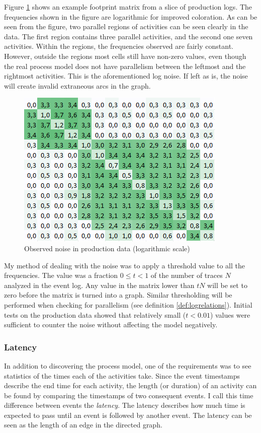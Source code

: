 \documentclass[english,12pt,a4paper,pdftex,sci,utf8]{aaltothesis}
\theoremstyle{definition}
\begin{document}
Figure \ref{fig:examplenoise} shows an example footprint matrix from a slice of production logs.
The frequencies shown in the figure are logarithmic for improved coloration.
As can be seen from the figure, two parallel regions of activities can be seen clearly in the data.
The first region contains three parallel activities, and the second one seven activities.
Within the regions, the frequencies observed are fairly constant.
However, outside the regions most cells still have non-zero values, even though the real process model
does not have parallelism between the leftmost and the rightmost activities.
This is the aforementioned log noise.
If left as is, the noise will create invalid extraneous arcs in the graph.

\begin{figure}[htb]
    \centering \includegraphics[width=0.6\linewidth]{gfx/noise.png}
    \caption{Observed noise in production data (logarithmic scale)}
    \label{fig:examplenoise}
\end{figure}

My method of dealing with the noise was to apply a threshold value to all the frequencies.
The value was a fraction $0 \le t < 1$ of the number of traces $N$ analyzed in the event log.
Any value in the matrix lower than $tN$ will be set to zero before the matrix is turned into a graph.
Similar thresholding will be performed when checking for parallelism (see definition \ref{def:logrelations}).
Initial tests on the production data showed that relatively small ($t < 0.01$) values were sufficient to counter the noise without affecting the model negatively.

\subsubsection{Latency}
\label{sec:latency}

In addition to discovering the process model, one of the requirements was to see statistics of the times each of the activities take. 
Since the event timestamps describe the end time for each activity, the length (or duration) of an activity can be found by comparing the timestamps of two consequent events. 
I call this time difference between events the \emph{latency}.
The latency describes how much time is expected to pass until an event is followed by another event.
The latency can be seen as the length of an edge in the directed graph.
\end{document}
